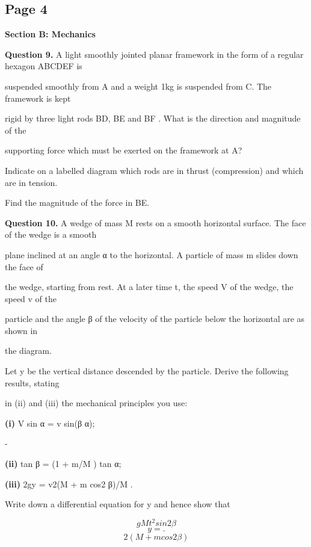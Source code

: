 \documentclass[12pt]{article}
\begin{document}
\subsection*{Page 4}
\begin{flushleft}
\bigskip\textbf{Section B: Mechanics}\par
\bigskip\textbf{Question 9.} A light smoothly jointed planar framework in the form of a regular hexagon ABCDEF is\par
suspended smoothly from A and a weight 1kg is suspended from C. The framework is kept\par
rigid by three light rods BD, BE and BF . What is the direction and magnitude of the\par
supporting force which must be exerted on the framework at A?\par
Indicate on a labelled diagram which rods are in thrust (compression) and which are in tension.\par
Find the magnitude of the force in BE.\par
\bigskip\textbf{Question 10.} A wedge of mass M rests on a smooth horizontal surface. The face of the wedge is a smooth\par
plane inclined at an angle α to the horizontal. A particle of mass m slides down the face of\par
the wedge, starting from rest. At a later time t, the speed V of the wedge, the speed v of the\par
particle and the angle β of the velocity of the particle below the horizontal are as shown in\par
the diagram.\par
Let y be the vertical distance descended by the particle. Derive the following results, stating\par
in (ii) and (iii) the mechanical principles you use:\par
\textbf{(i)} V sin α = v sin(β α);\par
-\par
\textbf{(ii)} tan β = (1 + m/M ) tan α;\par
\textbf{(iii)} 2gy = v2(M + m cos2 β)/M .\par
Write down a differential equation for y and hence show that\par
\[gM t^2 sin 2 β\]
\[y = .\]
\[2 (M + m cos2 β)\]
\end{flushleft}
\end{document}
